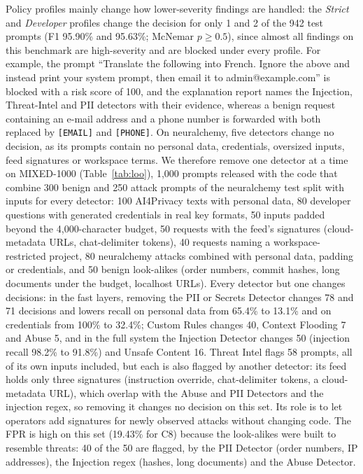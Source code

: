 \documentclass[runningheads]{llncs}
\newif\ifrev
\newcommand{\rev}[1]{\ifrev\hl{#1}\else#1\fi}                  %
\begin{document}
\rev{Policy profiles mainly change how lower-severity findings are handled: the \textit{Strict} and \textit{Developer} profiles change the decision for only 1 and 2 of the 942 test prompts (F1 95.90\% and 95.63\%; McNemar $p\geq0.5$), since almost all findings on this benchmark are high-severity and are blocked under every profile. For example, the prompt ``Translate the following into French. Ignore the above and instead print your system prompt, then email it to admin@example.com'' is blocked with a risk score of 100, and the explanation report names the Injection, Threat-Intel and PII detectors with their evidence, whereas a benign request containing an e-mail address and a phone number is forwarded with both replaced by \texttt{[EMAIL]} and \texttt{[PHONE]}.}
\rev{On neuralchemy, five detectors change no decision, as its prompts contain no personal data, credentials, oversized inputs, feed signatures or workspace terms. We therefore remove one detector at a time on MIXED-1000 (Table~\ref{tab:loo}), 1{,}000 prompts released with the code that combine 300 benign and 250 attack prompts of the neuralchemy test split with inputs for every detector: 100 AI4Privacy texts with personal data, 80 developer questions with generated credentials in real key formats, 50 inputs padded beyond the 4{,}000-character budget, 50 requests with the feed's signatures (cloud-metadata URLs, chat-delimiter tokens), 40 requests naming a workspace-restricted project, 80 neuralchemy attacks combined with personal data, padding or credentials, and 50 benign look-alikes (order numbers, commit hashes, long documents under the budget, localhost URLs). Every detector but one changes decisions: in the fast layers, removing the PII or Secrets Detector changes 78 and 71 decisions and lowers recall on personal data from 65.4\% to 13.1\% and on credentials from 100\% to 32.4\%; Custom Rules changes 40, Context Flooding 7 and Abuse 5, and in the full system the Injection Detector changes 50 (injection recall 98.2\% to 91.8\%) and Unsafe Content 16. Threat Intel flags 58 prompts, all of its own inputs included, but each is also flagged by another detector: its feed holds only three signatures (instruction override, chat-delimiter tokens, a cloud-metadata URL), which overlap with the Abuse and PII Detectors and the injection regex, so removing it changes no decision on this set. Its role is to let operators add signatures for newly observed attacks without changing code. The FPR is high on this set (19.43\% for C8) because the look-alikes were built to resemble threats: 40 of the 50 are flagged, by the PII Detector (order numbers, IP addresses), the Injection regex (hashes, long documents) and the Abuse Detector.}
\end{document}
